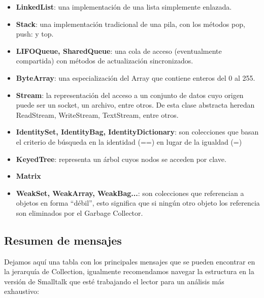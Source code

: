 \documentclass[a4paper,12pt]{book}
\begin{document}
\begin{itemize}
 \item \textbf{LinkedList}: una implementación de una lista simplemente enlazada.
 \item \textbf{Stack}: una implementación tradicional de una pila, con los métodos pop, push: y top.
 \item \textbf{LIFOQueue, SharedQueue}: una cola de acceso (eventualmente compartida) con métodos
 de actualización sincronizados.
 \item \textbf{ByteArray}: una especialización del Array que contiene enteros del 0 al 255.
 \item \textbf{Stream}: la representación del acceso a un conjunto de datos cuyo origen puede ser un socket, un
 archivo, entre otros. De esta clase abstracta heredan ReadStream, WriteStream, TextStream, entre otros.
 \item \textbf{IdentitySet, IdentityBag, IdentityDictionary}: son colecciones que basan el criterio de búsqueda
 en la identidad (==) en lugar de la igualdad (=)
 \item \textbf{KeyedTree}: representa un árbol cuyos nodos se acceden por clave.
 \item \textbf{Matrix}
 \item \textbf{WeakSet, WeakArray, WeakBag...}: son colecciones que referencian a objetos en forma ``débil'',
 esto significa que si ningún otro objeto los referencia son eliminados por el Garbage Collector.
\end{itemize}


\subsection{Resumen de mensajes}

Dejamos aquí una tabla con los principales mensajes que se pueden encontrar en la jerarquía de Collection,
igualmente recomendamos navegar la estructura en la versión de Smalltalk que esté trabajando el lector
para un análisis más exhaustivo:
\end{document}
